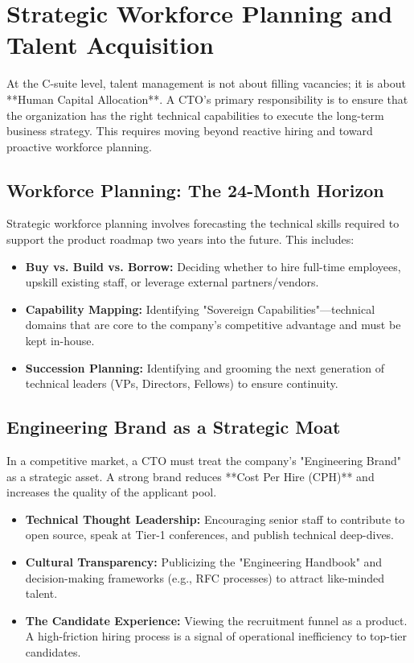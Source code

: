 \section{Strategic Workforce Planning and Talent Acquisition}

At the C-suite level, talent management is not about filling vacancies; it is about **Human Capital Allocation**. A CTO's primary responsibility is to ensure that the organization has the right technical capabilities to execute the long-term business strategy. This requires moving beyond reactive hiring and toward proactive workforce planning.

\subsection{Workforce Planning: The 24-Month Horizon}

Strategic workforce planning involves forecasting the technical skills required to support the product roadmap two years into the future. This includes:

\begin{itemize}
    \item \textbf{Buy vs. Build vs. Borrow:} Deciding whether to hire full-time employees, upskill existing staff, or leverage external partners/vendors.
    \item \textbf{Capability Mapping:} Identifying "Sovereign Capabilities"—technical domains that are core to the company's competitive advantage and must be kept in-house.
    \item \textbf{Succession Planning:} Identifying and grooming the next generation of technical leaders (VPs, Directors, Fellows) to ensure continuity.
\end{itemize}

\subsection{Engineering Brand as a Strategic Moat}

In a competitive market, a CTO must treat the company's "Engineering Brand" as a strategic asset. A strong brand reduces **Cost Per Hire (CPH)** and increases the quality of the applicant pool.

\begin{itemize}
    \item \textbf{Technical Thought Leadership:} Encouraging senior staff to contribute to open source, speak at Tier-1 conferences, and publish technical deep-dives.
    \item \textbf{Cultural Transparency:} Publicizing the "Engineering Handbook" and decision-making frameworks (e.g., RFC processes) to attract like-minded talent.
    \item \textbf{The Candidate Experience:} Viewing the recruitment funnel as a product. A high-friction hiring process is a signal of operational inefficiency to top-tier candidates.
\end{itemize}

